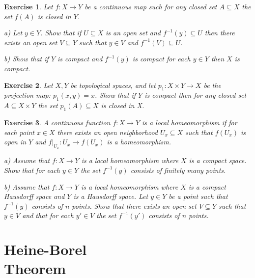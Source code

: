 \documentclass[11pt, letterpaper, oneside]{report}
\theoremstyle{pplain}
\newtheorem{ITERMVALUE THM}[theorem]{Intermediate Value Theorem}
\newtheorem{HEINEBOREL THM}[theorem]{Heine-Borel Theorem}
\newtheorem{UMETR THM}[theorem]{Urysohn Metrization Theorem}
\newtheorem{UMETR2 THM}[theorem]{Urysohn Metrization Theorem (v.2)}
\theoremstyle{ddefinition}
\theoremstyle{nnn}
\newtheorem{TDA NN}[theorem]{Topological Data Analysis. }
\theoremstyle{eexercise}
\newtheorem{exercise}{Exercise}[chapter]
\begin{document}
\begin{exercise}
Let $f\colon X\to Y$ be a continuous map such for any closed set $A\subseteq X$ the set 
$f(A)$ is closed in $Y$. 

a) Let $y\in Y$. Show that  if $U\subseteq X$ is an open set and  $f^{-1}(y) \subseteq U$ then there 
exists  an open set $V\subseteq Y$  such that $y\in V$ and $f^{-1}(V)\subseteq U$.    

b)  Show that if $Y$ is compact and $f^{-1}(y)$ is compact for each $y\in Y$ then
$X$ is compact. 
\end{exercise}




\begin{exercise}
Let $X, Y$ be topological spaces, and let $p_{1}\colon X\times Y \to X$ be the projection map: $p_{1}(x, y) = x$. 
Show that if $Y$ is compact then for any closed set $A\subseteq X\times Y$ the set $p_{1}(A) \subseteq X$
is closed in X. 
\end{exercise}



\begin{exercise}
A continuous function $f\colon X \to Y$ is a \emph{local homeomorphism} if  for each point $x\in X$ there exists an 
open neighborhood $U_{x}\subseteq X$ such that $f(U_{x})$ is open in $Y$ and 
$f|_{U_{x}}\colon U_{x} \to f(U_{x})$ is a homeomorphism.

a) Assume that $f\colon X \to Y$ is a local homeomorphism where  $X$ is  a compact space. 
Show that for each  $y\in Y$ the set $f^{-1}(y)$ consists of finitely many points. 

b) Assume that $f\colon X \to Y$ is a local homeomorphism where  $X$ is  a compact Hausdorff space
and $Y$ is a Hausdorff space.  Let $y\in Y$ be a point such that $f^{-1}(y)$ consists of $n$ points. 
Show that  there exists an open set $V\subseteq Y$ such that $y\in V$ and that for each $y'\in V$
the set $f^{-1}(y')$ consists of $n$ points. 
\end{exercise}





\newpage

\chapter[Heine-Borel Theorem]{Heine-Borel \\ Theorem}
\end{document}

